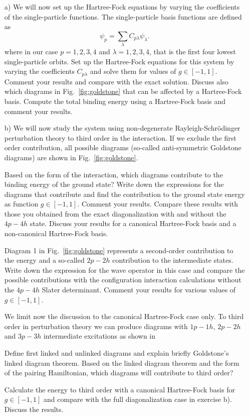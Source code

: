


  \begin{prob}\label{problem:prob8.5}
  \begin{enumerate}
  \item[a)] We will now set up the Hartree-Fock equations by varying
    the coefficients of the single-particle functions. The
    single-particle basis functions are defined as
  \[
  \psi_p = \sum_{\lambda} C_{p\lambda}\psi_{\lambda}.
  \]
  where in our case $p=1,2,3,4$ and $\lambda=1,2,3,4$, that is the
  first four lowest single-particle orbits.  Set up the Hartree-Fock equations for
  this system by varying the coefficients $C_{p\lambda}$ and solve
  them for values of $g\in [-1,1]$.  Comment your results and compare
  with the exact solution. Discuss also which diagrams in
  Fig.~\ref{fig:goldstone} that can be affected by a Hartree-Fock
  basis. Compute the total binding energy using a Hartree-Fock basis
  and comment your results.

  \item[b)] We will now study the system using non-degenerate
    Rayleigh-Schr\"odinger perturbation theory to third order in the
    interaction.  If we exclude the first order contribution, all
    possible diagrams (so-called anti-symmetric Goldstone diagrams)
    are shown in Fig.~\ref{fig:goldstone}.


  Based on the form of the interaction, which diagrams contribute to
  the binding energy of the ground state?  Write down the expressions
  for the diagrams that contribute and find the contribution to the
  ground state energy as function $g\in [-1,1]$. Comment your results.
  Compare these results with those you obtained from the exact
  diagonalization with and without the $4p-4h$ state.  Discuss your
  results for a canonical Hartree-Fock basis and a non-canonical
  Hartree-Fock basis.


  Diagram 1 in Fig.~\ref{fig:goldstone} represents a second-order
  contribution to the energy and a so-called $2p-2h$ contribution to
  the intermediate states. Write down the expression for the wave
  operator in this case and compare the possible contributions with
  the configuration interaction calculations without the $4p-4h$
  Slater determinant. Comment your results for various values of $g\in
  [-1,1]$.

  We limit now the discussion to the canonical Hartree-Fock case
  only. To third order in perturbation theory we can produce diagrams
  with $1p-1h$, $2p-2h$ and $3p-3h$ intermediate excitations as shown in


  Define first linked and unlinked diagrams and explain briefly
  Goldstone's linked diagram theorem.  Based on the linked diagram
  theorem and the form of the pairing Hamiltonian, which diagrams will
  contribute to third order?

  Calculate the energy to third order with a canonical Hartree-Fock
  basis for $g\in [-1,1]$ and compare with the full diagonalization
  case in exercise b). Discuss the results.
  \end{enumerate}



  \end{prob}


